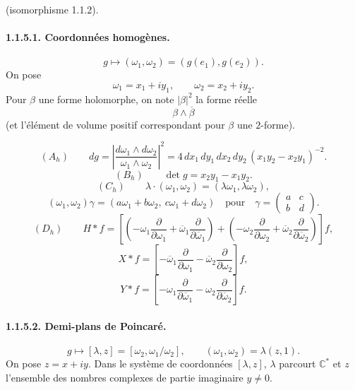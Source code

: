 \documentclass[10pt,a4paper]{article}
\providecommand{\C}{\mathbb C}
\begin{document}
\clearpage
{}
\hypertarget{authority-12}{}
\noindent(isomorphisme 1.1.2).

\paragraph{1.1.5.1. Coordonnées homogènes.}
\[
g\longmapsto(\omega_1,\omega_2)=(g(e_1),g(e_2)).
\]
On pose
\[
\omega_1=x_1+iy_1,\qquad \omega_2=x_2+iy_2.
\]
Pour \(\beta\) une forme holomorphe, on note \(|\beta|^2\) la forme réelle
\[
\beta\wedge\overline\beta
\]
(et l'élément de volume positif correspondant pour \(\beta\) une \(2\)-forme).

\[
(A_h)\qquad
dg=\left|\frac{d\omega_1\wedge d\omega_2}{\omega_1\wedge\omega_2}\right|^2
=
4\,dx_1\,dy_1\,dx_2\,dy_2\,(x_1y_2-x_2y_1)^{-2}.
\]
\[
(B_h)\qquad
\det g=x_2y_1-x_1y_2.
\]
\[
(C_h)\qquad
\lambda\cdot(\omega_1,\omega_2)=(\lambda\omega_1,\lambda\omega_2),
\]
\[
(\omega_1,\omega_2)\gamma=(a\omega_1+b\omega_2,\ c\omega_1+d\omega_2)
\quad\text{pour}\quad
\gamma=\begin{pmatrix}a&c\\ b&d\end{pmatrix}.
\]
\[
(D_h)\qquad
H*f=\left[\left(-\omega_1\frac{\partial}{\partial\omega_1}
+\overline\omega_1\frac{\partial}{\partial\overline\omega_1}\right)
+\left(-\omega_2\frac{\partial}{\partial\omega_2}
+\overline\omega_2\frac{\partial}{\partial\overline\omega_2}\right)\right]f,
\]
\[
X*f=\left[-\overline\omega_1\frac{\partial}{\partial\omega_1}
-\overline\omega_2\frac{\partial}{\partial\omega_2}\right]f,
\]
\[
Y*f=\left[-\omega_1\frac{\partial}{\partial\overline\omega_1}
-\omega_2\frac{\partial}{\partial\overline\omega_2}\right]f.
\]

\paragraph{1.1.5.2. Demi-plans de Poincaré.}
\[
g\longmapsto[\lambda,z]=[\omega_2,\omega_1/\omega_2],\qquad
(\omega_1,\omega_2)=\lambda(z,1).
\]
On pose \(z=x+iy\). Dans le système de coordonnées \([\lambda,z]\), \(\lambda\) parcourt \(\C^*\) et \(z\) l'ensemble des nombres complexes de partie imaginaire \(y\ne0\).
\end{document}
